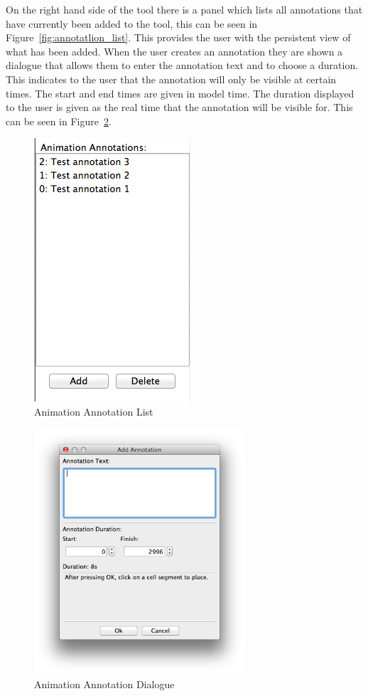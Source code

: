 On the right hand side of the tool there is a panel which lists all annotations that have currently been added to the tool, this can be seen in Figure~\ref{fig:annotatlion_list}.  This provides the user with the persistent view of what has been added.  When the user creates an annotation they are shown a dialogue that allows them to enter the annotation text and to choose a duration.  This indicates to the user that the annotation will only be visible at certain times.  The start and end times are given in model time.  The duration displayed to the user is given as the real time that the annotation will be visible for.  This can be seen in Figure~\ref{fig:annotation_dialog}.

\begin{figure}[h!]
    \centering
    \includegraphics[height=0.4\textheight]{images/annotation_list.png}
    \caption{Animation Annotation List}
    \label{fig:annotation_list}
\end{figure}

\begin{figure}[h!]
    \centering
    \includegraphics[width=0.7\textwidth]{images/annotation_dialog.png}
    \caption{Animation Annotation Dialogue}
    \label{fig:annotation_dialog}
\end{figure}

